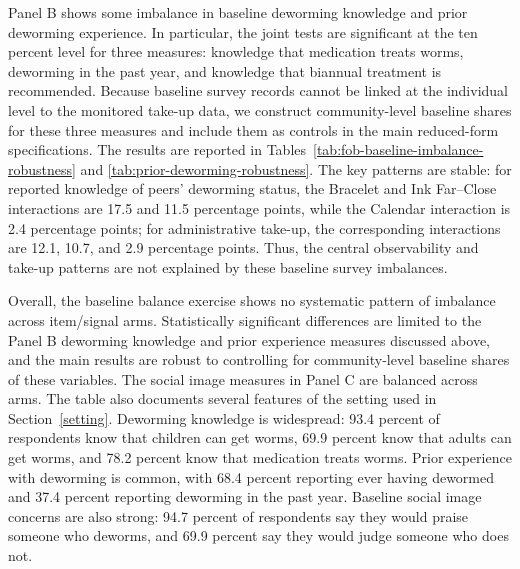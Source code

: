 \documentclass[ECM\space ReStud.tex]{subfiles}
\begin{document}
  Panel B shows some imbalance in baseline deworming knowledge and prior deworming
  experience. In particular, the joint tests are significant at the ten percent
  level for three measures: knowledge that medication treats worms, deworming in the
  past year, and knowledge that biannual treatment is recommended. Because baseline
  survey records cannot be linked at the individual level to the monitored
  take-up data, we construct community-level baseline
  shares for these three measures and include them as controls in the main reduced-form specifications. The results are reported in Tables~\ref{tab:fob-baseline-imbalance-robustness} and \ref{tab:prior-deworming-robustness}. The key patterns
  are stable: for reported knowledge of peers' deworming status, the Bracelet and
  Ink Far--Close interactions are 17.5 and 11.5 percentage points, while the
  Calendar interaction is 2.4 percentage points; for administrative take-up, the
  corresponding interactions are 12.1, 10.7, and 2.9 percentage points. Thus, the
  central observability and take-up patterns are not explained by these baseline
  survey imbalances.

  Overall, the baseline balance exercise shows no systematic pattern of imbalance across item/signal arms. Statistically significant differences are limited to the Panel B deworming knowledge and prior experience measures discussed above, and the main results are robust to controlling for community-level baseline shares of these variables. The social image measures in Panel C are balanced across arms. The table also documents several features of the setting used in Section~\ref{setting}. Deworming knowledge is widespread: 93.4 percent of respondents know that children can get worms, 69.9 percent know that adults can get worms, and 78.2 percent know that medication treats worms. Prior experience with deworming is common, with 68.4 percent reporting ever having dewormed and 37.4 percent reporting deworming in the past year. Baseline social image concerns are also strong: 94.7 percent of respondents say they would praise someone who deworms, and 69.9 percent say they would judge someone who does not.


\end{document}
